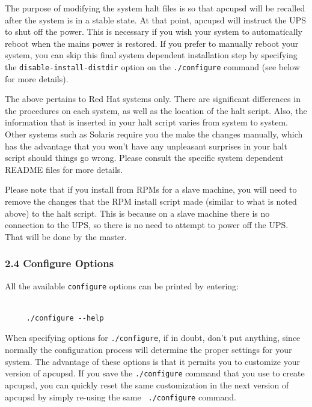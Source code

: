 The purpose of modifying the system halt files is so that apcupsd will be
recalled after the system is in a stable state. At that point, apcupsd will
instruct the UPS to shut off the power. This is necessary if you wish your
system to automatically reboot when the mains power is restored. If you prefer
to manually reboot your system, you can skip this final system dependent
installation step by specifying the {\tt disable-install-distdir} option on
the {\tt ./configure} command (see below for more details).  

The above pertains to Red Hat systems only. There are significant differences
in the procedures on each system, as well as the location of the halt script.
Also, the information that is inserted in your halt script varies from system
to system. Other systems such as Solaris require you the make the changes
manually, which has the advantage that you won't have any unpleasant surprises
in your halt script should things go wrong. Please consult the specific system
dependent README files for more details.  

Please note that if you install from RPMs for a slave machine, you will need
to remove the changes that the RPM install script made (similar to what is
noted above) to the halt script. This is because on a slave machine there is
no connection to the UPS, so there is no need to attempt to power off the UPS.
That will be done by the master. 

\label{Configure-Options}

\subsubsection*{2.4 Configure Options}

\label{index-configure-options-24}
\label{index-options_002c-configure-25}
All the available {\tt configure} options can be printed by entering: 

\footnotesize
\begin{verbatim}
     
     ./configure --help
\end{verbatim}
\normalsize

When specifying options for {\tt ./configure}, if in doubt, don't put
anything, since normally the configuration process will determine the proper
settings for your system. The advantage of these options is that it permits
you to customize your version of apcupsd.  If you save the {\tt ./configure}
command that you use to create apcupsd, you can quickly reset the same
customization in the next version of apcupsd by simply re-using the same {\tt
./configure} command.  

